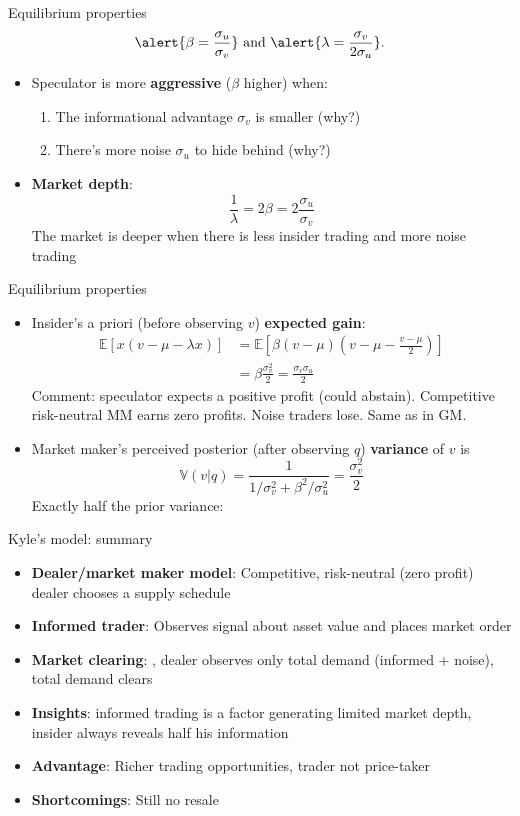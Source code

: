 \documentclass[english,10pt
,aspectratio=169
]{beamer}
\begin{document}
\begin{frame}{Equilibrium properties}
	\[
		\alert{ \beta = \frac{\sigma_u}{\sigma_v}}\text{ and } \alert{ \lambda = \frac{\sigma_v}{2\sigma_u}}.
	\]
	\begin{itemize}
		\item Speculator is more \textbf{aggressive} ($\beta$ higher) when:
		\begin{enumerate}
			\item The informational advantage $\sigma_v$ is smaller (why?)
			\item There's more noise $\sigma_u$ to hide behind (why?)
		\end{enumerate}
		\pause
		\item \textbf{Market depth}:
		\[
			\frac{1}{\lambda} = 2\beta = 2 \frac{\sigma_u}{\sigma_v}
		\]
		The market is deeper when there is less insider trading and more noise trading
	\end{itemize}
\end{frame}


\begin{frame}{Equilibrium properties}
	\begin{itemize}
		\item Insider's a priori (before observing $v$) \textbf{expected gain}:
		\begin{align*}
		\mathbb{E}[x(v-\mu-\lambda x)] 
		& =\mathbb{E} \left[ \beta(v-\mu)\left(v-\mu-\frac{v-\mu}{2}\right) \right] \\
		&=\beta\frac{ \sigma^2_v}{2}=\frac{\sigma_v \sigma_u}{2}
		\end{align*}
		Comment: speculator expects a positive profit (could abstain). Competitive risk-neutral MM earns zero profits. Noise traders lose. Same as in GM.
		\pause
		\item Market maker's perceived posterior (after observing $q$) \textbf{variance} of $v$ is
		\[
		\mathbb{V}(v|q) = \frac{1}{1/\sigma^2_v + \beta^2/\sigma^2_u} = \frac{\sigma^2_v}{2}
		\]
		Exactly half the prior variance: 
	\end{itemize}
\end{frame}


\begin{frame}{Kyle's model: summary}
	\begin{itemize}
		\item \textbf{Dealer/market maker model}: Competitive, risk-neutral (zero profit) dealer chooses a supply schedule
		\item \textbf{Informed trader}: Observes signal about asset value and places market order
		\item \textbf{Market clearing}: , dealer observes only total demand (informed + noise), total demand clears
		\item \textbf{Insights}: informed trading is a factor generating limited market depth, insider always reveals half his information
		\item \textbf{Advantage}: Richer trading opportunities, trader not price-taker
		\item \textbf{Shortcomings}: Still no resale
	\end{itemize}
\end{frame}
\end{document}
